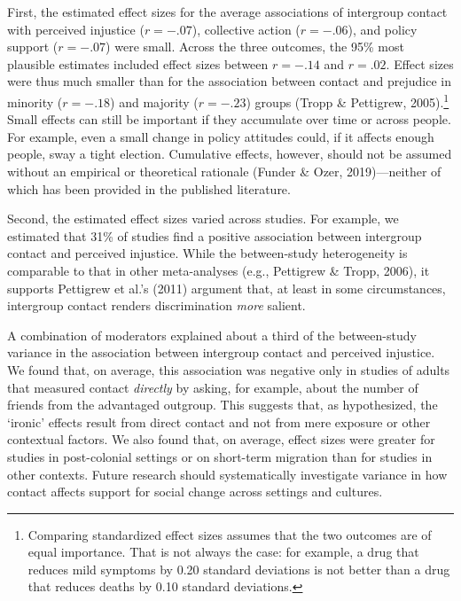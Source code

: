 \documentclass[twocolumn, 11pt, letterpaper]{article}
\begin{document}
First, the estimated effect sizes for the average associations of
intergroup contact with perceived injustice (\(r = -.07\)), collective
action (\(r = -.06\)), and policy support (\(r = -.07\)) were small.
Across the three outcomes, the 95\% most plausible estimates included
effect sizes between \(r = -.14\) and \(r = .02\). Effect sizes were
thus much smaller than for the association between contact and prejudice
in minority (\(r = -.18\)) and majority (\(r = -.23\)) groups (Tropp \&
Pettigrew, 2005).\footnote{Comparing standardized effect sizes assumes
  that the two outcomes are of equal importance. That is not always the
  case: for example, a drug that reduces mild symptoms by 0.20 standard
  deviations is not better than a drug that reduces deaths by 0.10
  standard deviations.} Small effects can still be important if they
accumulate over time or across people. For example, even a small change
in policy attitudes could, if it affects enough people, sway a tight
election. Cumulative effects, however, should not be assumed without an
empirical or theoretical rationale (Funder \& Ozer, 2019)---neither of
which has been provided in the published literature.

Second, the estimated effect sizes varied across studies. For example,
we estimated that 31\% of studies find a positive association between
intergroup contact and perceived injustice. While the between-study
heterogeneity is comparable to that in other meta-analyses (e.g.,
Pettigrew \& Tropp, 2006), it supports Pettigrew et al.'s (2011)
argument that, at least in some circumstances, intergroup contact
renders discrimination \emph{more} salient.

A combination of moderators explained about a third of the between-study
variance in the association between intergroup contact and perceived
injustice. We found that, on average, this association was negative only
in studies of adults that measured contact \emph{directly} by asking,
for example, about the number of friends from the advantaged outgroup.
This suggests that, as hypothesized, the `ironic' effects result from
direct contact and not from mere exposure or other contextual factors.
We also found that, on average, effect sizes were greater for studies in
post-colonial settings or on short-term migration than for studies in
other contexts. Future research should systematically investigate
variance in how contact affects support for social change across
settings and cultures.
\end{document}
